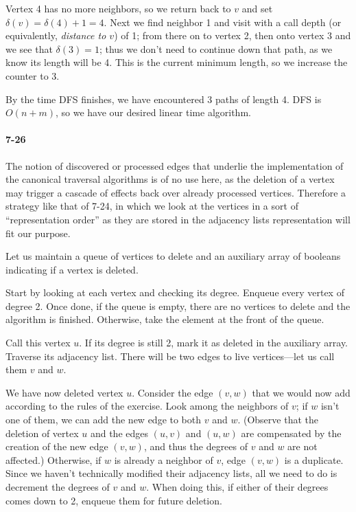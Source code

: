 \documentclass{report}
\begin{document}
Vertex 4 has no more neighbors, so we return back to $v$ and set $\delta(v)=\delta(4)+1=4$. Next we find neighbor 1 and visit with a call depth (or equivalently, \emph{distance to $v$}) of 1; from there on to vertex 2, then onto vertex 3 and we see that $\delta(3)=1$; thus we don't need to continue down that path, as we know its length will be 4. This is the current minimum length, so we increase the counter to 3.

By the time DFS finishes, we have encountered 3 paths of length 4. DFS is $O(n+m)$, so we have our desired linear time algorithm.

\paragraph{7-26} The notion of discovered or processed edges that underlie the implementation of the canonical traversal algorithms is of no use here, as the deletion of a vertex may trigger a cascade of effects back over already processed vertices. Therefore a strategy like that of 7-24, in which we look at the vertices in a sort of ``representation order'' as they are stored in the adjacency lists representation will fit our purpose.

\smallskip

Let us maintain a queue of vertices to delete and an auxiliary array of booleans indicating if a vertex is deleted.

Start by looking at each vertex and checking its degree. Enqueue every vertex of degree 2. Once done, if the queue is empty, there are no vertices to delete and the algorithm is finished. Otherwise, take the element at the front of the queue.

Call this vertex $u$. If its degree is still 2, mark it as deleted in the auxiliary array. Traverse its adjacency list. There will be two edges to live vertices---let us call them $v$ and $w$.

We have now deleted vertex $u$. Consider the edge $(v,w)$ that we would now add according to the rules of the exercise. Look among the neighbors of $v$; if $w$ isn't one of them, we can add the new edge to both $v$ and $w$. (Observe that the deletion of vertex $u$ and the edges $(u,v)$ and $(u,w)$ are compensated by the creation of the new edge $(v,w)$, and thus the degrees of $v$ and $w$ are not affected.) Otherwise, if $w$ is already a neighbor of $v$, edge $(v,w)$ is a duplicate. Since we haven't technically modified their adjacency lists, all we need to do is decrement the degrees of $v$ and $w$. When doing this, if either of their degrees comes down to 2, enqueue them for future deletion.
\end{document}
